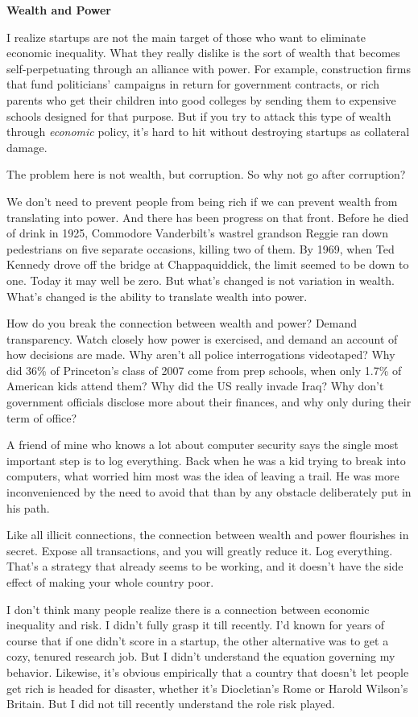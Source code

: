 \documentclass[12pt]{book}
\begin{document}
\textbf{Wealth and Power}

I realize startups are not the main target of those who want to
eliminate economic inequality. What they really dislike is the sort of
wealth that becomes self-perpetuating through an alliance with power.
For example, construction firms that fund politicians' campaigns in
return for government contracts, or rich parents who get their children
into good colleges by sending them to expensive schools designed for
that purpose. But if you try to attack this type of wealth through
\emph{economic} policy, it's hard to hit without destroying startups as
collateral damage.

The problem here is not wealth, but corruption. So why not go after
corruption?

We don't need to prevent people from being rich if we can prevent wealth
from translating into power. And there has been progress on that front.
Before he died of drink in 1925, Commodore Vanderbilt's wastrel grandson
Reggie ran down pedestrians on five separate occasions, killing two of
them. By 1969, when Ted Kennedy drove off the bridge at Chappaquiddick,
the limit seemed to be down to one. Today it may well be zero. But
what's changed is not variation in wealth. What's changed is the ability
to translate wealth into power.

How do you break the connection between wealth and power? Demand
transparency. Watch closely how power is exercised, and demand an
account of how decisions are made. Why aren't all police interrogations
videotaped? Why did 36\% of Princeton's class of 2007 come from prep
schools, when only 1.7\% of American kids attend them? Why did the US
really invade Iraq? Why don't government officials disclose more about
their finances, and why only during their term of office?

A friend of mine who knows a lot about computer security says the single
most important step is to log everything. Back when he was a kid trying
to break into computers, what worried him most was the idea of leaving a
trail. He was more inconvenienced by the need to avoid that than by any
obstacle deliberately put in his path.

Like all illicit connections, the connection between wealth and power
flourishes in secret. Expose all transactions, and you will greatly
reduce it. Log everything. That's a strategy that already seems to be
working, and it doesn't have the side effect of making your whole
country poor.

I don't think many people realize there is a connection between economic
inequality and risk. I didn't fully grasp it till recently. I'd known
for years of course that if one didn't score in a startup, the other
alternative was to get a cozy, tenured research job. But I didn't
understand the equation governing my behavior. Likewise, it's obvious
empirically that a country that doesn't let people get rich is headed
for disaster, whether it's Diocletian's Rome or Harold Wilson's Britain.
But I did not till recently understand the role risk played.
\end{document}
